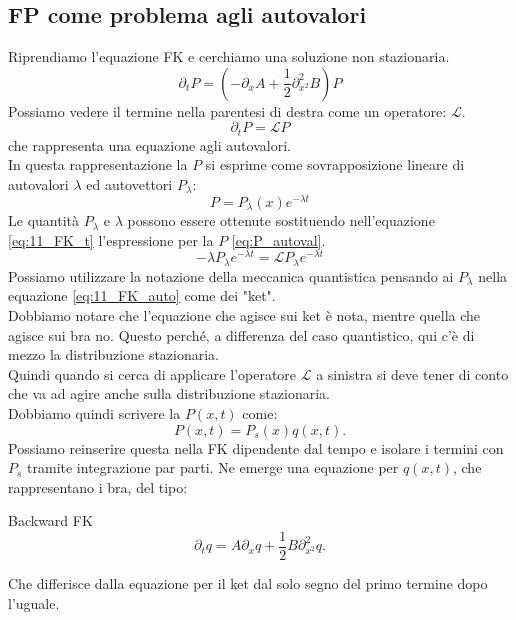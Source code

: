 \subsection{FP come problema agli autovalori}%
\label{sub:Fokker-Plank dipendente dal tempo}
Riprendiamo l'equazione FK e cerchiamo una soluzione non stazionaria.
\begin{equation}
    \partial_{t}P = \left(-\partial_{x}A + \frac{1}{2}\partial^2_{x^2} B\right)P 
    \label{eq:11_FK_t}
\end{equation}
Possiamo vedere il termine nella parentesi di destra come un operatore: $\mathcal{L}$.
\[
    \partial_{t}P = \mathcal{L}P
\] 
che rappresenta una equazione agli autovalori. \\
In questa rappresentazione la $P$ si esprime come sovrapposizione lineare di autovalori $\lambda$ ed autovettori $P_\lambda$:
\begin{equation}
    P = P_\lambda (x) e^{-\lambda t}
    \label{eq:P_autoval}
\end{equation}
Le quantità $P_\lambda$ e $\lambda$ possono essere ottenute sostituendo nell'equazione \ref{eq:11_FK_t} l'espressione per la $P$ \ref{eq:P_autoval}.
\begin{equation}
    -\lambda P_\lambda  e^{-\lambda t} = \mathcal{L}P_\lambda  e^{-\lambda t}
    \label{eq:11_FK_auto}
\end{equation}
Possiamo utilizzare la notazione della meccanica quantistica pensando ai $P_\lambda$ nella equazione \ref{eq:11_FK_auto} come dei "ket". \\
Dobbiamo notare che l'equazione che agisce sui ket è nota, mentre quella che agisce sui bra no. Questo perché, a differenza del caso quantistico, qui c'è di mezzo la distribuzione stazionaria. \\
Quindi quando si cerca di applicare l'operatore $\mathcal{L}$ a sinistra si deve tener di conto che va ad agire anche sulla distribuzione stazionaria.\\
Dobbiamo quindi scrivere la $P(x,t)$ come:
\[
    P(x,t) = P_s(x) q(x,t) 
.\] 
Possiamo reinserire questa nella FK dipendente dal tempo e isolare i termini con $P_s$  tramite integrazione par parti. Ne emerge una equazione per $q(x,t)$, che rappresentano i bra, del tipo:
\begin{redbox}{Backward FK}
\[
    \partial_{t}q = A\partial_{x}q + \frac{1}{2}B\partial^2_{x^2}q
.\]     
\end{redbox}
\noindent
Che differisce dalla equazione per il ket dal solo segno del primo termine dopo l'uguale. \\
